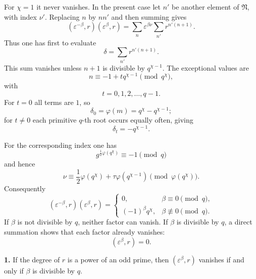 \documentclass[11pt]{article}
\providecommand{\grpN}{\mathfrak N}
\begin{document}
For $\chi=1$ it never vanishes. In the present case let $n'$ be another element of $\grpN$, with index $\nu'$. Replacing $n$ by $nn'$ and then summing gives
\begin{equation}
 (\varepsilon^{-\beta},r)(\varepsilon^\beta,r)
 =\sum_n \varepsilon^{\beta\nu}
 \sum_{n'} r^{n'(n+1)}.
\tag{4}
\end{equation}
Thus one has first to evaluate
\begin{equation}
 \delta=\sum_{n'}r^{n'(n+1)}.
\tag{5}
\end{equation}
This sum vanishes unless $n+1$ is divisible by $q^{\chi-1}$. The exceptional values are
\begin{equation}
 n\equiv -1+tq^{\chi-1}\pmod {q^\chi},
\tag{6}
\end{equation}
with
\begin{equation}
 t=0,1,2,
\ldots,q-1.
\tag{7}
\end{equation}
For $t=0$ all terms are $1$, so
\begin{equation}
 \delta_0=\varphi(m)=q^\chi-q^{\chi-1};
\tag{8}
\end{equation}
for $t\ne0$ each primitive $q$-th root occurs equally often, giving
\begin{equation}
 \delta_t=-q^{\chi-1}.
\tag{9}
\end{equation}

For the corresponding index one has
\begin{equation}
 g^{\frac12\varphi(q^\chi)}\equiv -1\pmod q
\tag{10}
\end{equation}
and hence
\begin{equation}
 \nu\equiv \frac12\varphi(q^\chi)+\tau\varphi(q^{\chi-1})\pmod {\varphi(q^\chi)}.
\tag{11}
\end{equation}
Consequently
\begin{equation}
 (\varepsilon^{-\beta},r)(\varepsilon^\beta,r)=
 \begin{cases}
 0,&\beta\equiv0\pmod q,\\
 (-1)^\beta q^\chi,&\beta\not\equiv0\pmod q.
 \end{cases}
\tag{12}
\end{equation}
If $\beta$ is not divisible by $q$, neither factor can vanish. If $\beta$ is divisible by $q$, a direct summation shows that each factor already vanishes:
\begin{equation}
 (\varepsilon^\beta,r)=0.
\tag{13}
\end{equation}

\medskip
\noindent\textbf{1.} If the degree of $r$ is a power of an odd prime, then $(\varepsilon^\beta,r)$ vanishes if and only if $\beta$ is divisible by $q$.
\end{document}
